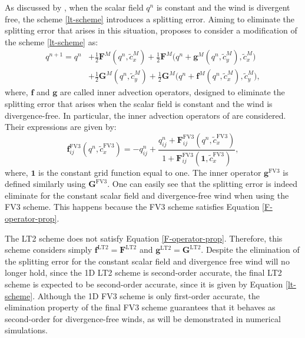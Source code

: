 \documentclass[preprint,12pt]{elsarticle}
\begin{document}
\begin{linenumbers}
As discussed by \cite{lin:1996}, when the scalar field $q^n$ is constant and the wind is divergent free, the scheme \eqref{lt-scheme} introduces a splitting error.
Aiming to eliminate the splitting error that arises in this situation, \cite{lin:1996} proposes to consider a modification of the scheme \eqref{lt-scheme} as:
\begin{align}
	\label{tr-scheme}
	{q}^{n+1}  
	= {q}^n &+ \frac{1}{2}\mathbf{F}^M({q}^n,\tilde{c}^{M}_x) +
	\frac{1}{2}\mathbf{F}^M\bigg({q}^n + \mathbf{g}^M({q}^n,  \tilde{c}^{M}_y), \tilde{c}^{M}_x\bigg) \nonumber\\
	&+\frac{1}{2}\mathbf{G}^M({q}^n, \tilde{c}^{M}_y) + 
	\frac{1}{2}\mathbf{G}^M\bigg({q}^n + \mathbf{f}^M({q}^n,  \tilde{c}^{M}_x), \tilde{c}^{M}_y\bigg),
\end{align}
where, $\mathbf{f}$ and $\mathbf{g}$ are called inner advection operators, designed to eliminate the splitting error that arises when the scalar field is constant and the wind is divergence-free.
In particular, the inner advection operators of \cite{putman:2007,harris:2016} are considered. 
Their expressions are given by:
\begin{equation}
	\mathbf{f}_{ij}^{\text{FV3}}({q}^n, \tilde{c}^{\text{FV3}}_x) = 
	-{q}_{ij}^n +
	\frac{{q}_{ij}^n + \mathbf{F}_{ij}^{\text{FV3}}({q}^n,\tilde{c}^{\text{FV3}}_x)}{1  + \mathbf{F}_{ij}^{\text{FV3}}(\mathbf{1},\tilde{c}^{\text{FV3}}_x)},
\end{equation}
where, $\mathbf{1}$ is the constant grid function equal to one.
The inner operator  $\mathbf{g}^{\text{FV3}}$ is defined similarly using $\mathbf{G}^{\text{FV3}}$.
One can easily see that the splitting error is indeed eliminate for the constant scalar field and divergence-free wind when using the FV3 scheme.
This happens because the FV3 scheme satisfies Equation  \eqref{F-operator-prop}.

The LT2 scheme does not satisfy Equation \eqref{F-operator-prop}.
Therefore, this scheme considers simply $\mathbf{f}^{\text{LT2}}=\mathbf{F}^{\text{LT2}}$ and $\mathbf{g}^{\text{LT2}}=\mathbf{G}^{\text{LT2}}$.
Despite the elimination of the splitting error for the constant scalar field and divergence free wind will no longer hold, since the 1D LT2 scheme is second-order accurate, the final LT2 scheme is expected to be second-order accurate, since it is given by Equation \eqref{lt-scheme}.
Although the 1D FV3 scheme is only first-order accurate, the elimination property of the final FV3 scheme guarantees that it behaves as second-order for divergence-free winds, as will be demonstrated in numerical simulations.


\end{linenumbers}
\end{document}
